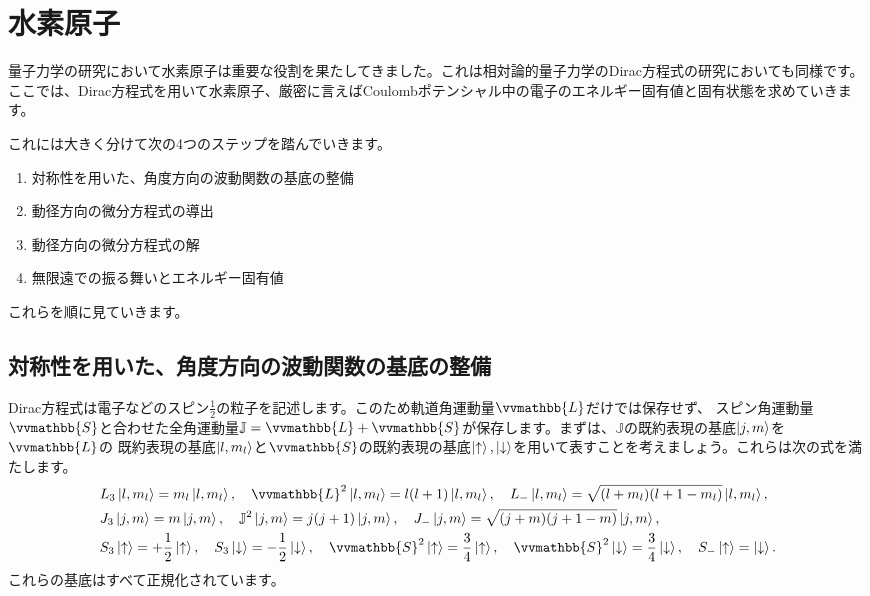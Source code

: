 \documentclass[report,paper=a4, fontsize=12pt, line_length=16cm, number_of_lines=33,dvipdfmx]{jlreq}
\numberwithin{equation}{chapter}
\newcommand{\Lb}{\vvmathbb{L}}
\newcommand{\Sb}{\vvmathbb{S}}
\newcommand{\Jb}{\mathbb{J}}
\newcommand{\uket}{\ket{\uparrow}}
\newcommand{\dket}{\ket{\downarrow}}
\newcommand{\ml}{m_{l}}
\begin{document}
\section{水素原子}

量子力学の研究において水素原子は重要な役割を果たしてきました。これは相対論的量子力学のDirac方程式の研究においても同様です。
ここでは、Dirac方程式を用いて水素原子、厳密に言えばCoulombポテンシャル中の電子のエネルギー固有値と固有状態を求めていきます。

これには大きく分けて次の4つのステップを踏んでいきます。
\begin{enumerate}
  \item 対称性を用いた、角度方向の波動関数の基底の整備
  \item 動径方向の微分方程式の導出
  \item 動径方向の微分方程式の解
  \item 無限遠での振る舞いとエネルギー固有値
\end{enumerate}
これらを順に見ていきます。

\subsection{対称性を用いた、角度方向の波動関数の基底の整備}\label{sec:harmonics}
Dirac方程式は電子などのスピン$\frac12$の粒子を記述します。このため軌道角運動量$\Lb$だけでは保存せず、
スピン角運動量$\Sb$と合わせた全角運動量$\Jb=\Lb+\Sb$が保存します。まずは、$\Jb$の既約表現の基底$\ket{j,m}$を$\Lb$の
既約表現の基底$\ket{l,\ml}$と$\Sb$の既約表現の基底$\uket,\dket$を用いて表すことを考えましょう。これらは次の式を満たします。
\begin{align}
  &L_3\ket{l,\ml}=\ml\ket{l,\ml},\quad \Lb^2\ket{l,\ml}=l(l+1)\ket{l,\ml},\quad L_{-}\ket{l,\ml}=\sqrt{(l+\ml)(l+1-\ml)}\ket{l,\ml},\\
  &J_3\ket{j,m}=m\ket{j,m},\quad \Jb^2\ket{j,m}=j(j+1)\ket{j,m},\quad J_{-}\ket{j,m}=\sqrt{(j+m)(j+1-m)}\ket{j,m},\\
  &S_3\uket=+\frac12\uket,\quad S_3\dket=-\frac12\dket,\quad
  \Sb^2\uket=\frac34\uket,\quad
  \Sb^2\dket=\frac34\dket,\quad
  S_{-}\uket=\dket.
\end{align}
これらの基底はすべて正規化されています。
\end{document}
